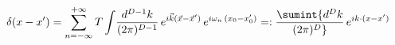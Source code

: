 \begin{equation}
  \label{eq:defdeltafint}
\delta(x-x') = \sum\limits_{n = -\infty}^{+\infty} 
T \int\! {d^{D-1}k \over (2 \pi)^{D-1}} \, e^{i \vec k (\vec x - \vec x')}
\, e^{i \omega_n \, (x_0 - x_0')} 
=: \sumint  {d^{D}k \over (2 \pi)^{D}} \, e^{i k \cdot (x - x')}
\end{equation}

